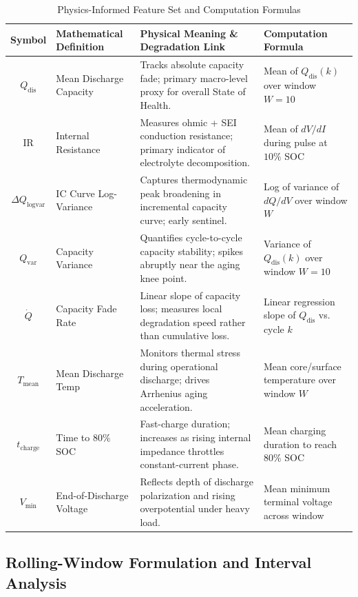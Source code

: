 \documentclass[pdflatex,sn-mathphys-num]{sn-jnl}%
\theoremstyle{thmstyleone}%
\theoremstyle{thmstyletwo}%
\theoremstyle{thmstylethree}%
\begin{document}
\begin{table}[h!]
\centering
\caption{Physics-Informed Feature Set and Computation Formulas}\label{tab:features}
\small
\begin{tabular}{@{}c p{2.2cm} p{4.8cm} p{3.2cm}@{}}
\toprule
\textbf{Symbol} & \textbf{Mathematical Definition} & \textbf{Physical Meaning \& Degradation Link} & \textbf{Computation Formula} \\
\midrule
$Q_{\text{dis}}$ & Mean Discharge Capacity & Tracks absolute capacity fade; primary macro-level proxy for overall State of Health. & Mean of $Q_{\text{dis}}(k)$ over window $W=10$ \\[1.2ex]
$\text{IR}$ & Internal Resistance & Measures ohmic + SEI conduction resistance; primary indicator of electrolyte decomposition. & Mean of $dV/dI$ during pulse at $10\%$ SOC \\[1.2ex]
$\Delta Q_{\log\text{var}}$ & IC Curve Log-Variance & Captures thermodynamic peak broadening in incremental capacity curve; early sentinel. & Log of variance of $dQ/dV$ over window $W$ \\[1.2ex]
$Q_{\text{var}}$ & Capacity Variance & Quantifies cycle-to-cycle capacity stability; spikes abruptly near the aging knee point. & Variance of $Q_{\text{dis}}(k)$ over window $W=10$ \\[1.2ex]
$\dot{Q}$ & Capacity Fade Rate & Linear slope of capacity loss; measures local degradation speed rather than cumulative loss. & Linear regression slope of $Q_{\text{dis}}$ vs. cycle $k$ \\[1.2ex]
$T_{\text{mean}}$ & Mean Discharge Temp & Monitors thermal stress during operational discharge; drives Arrhenius aging acceleration. & Mean core/surface temperature over window $W$ \\[1.2ex]
$t_{\text{charge}}$ & Time to $80\%$ SOC & Fast-charge duration; increases as rising internal impedance throttles constant-current phase. & Mean charging duration to reach $80\%$ SOC \\[1.2ex]
$V_{\min}$ & End-of-Discharge Voltage & Reflects depth of discharge polarization and rising overpotential under heavy load. & Mean minimum terminal voltage across window \\
\bottomrule
\end{tabular}
\end{table}

\clearpage

\subsection{Rolling-Window Formulation and Interval Analysis}\label{subsec:rolling_window}
\end{document}
